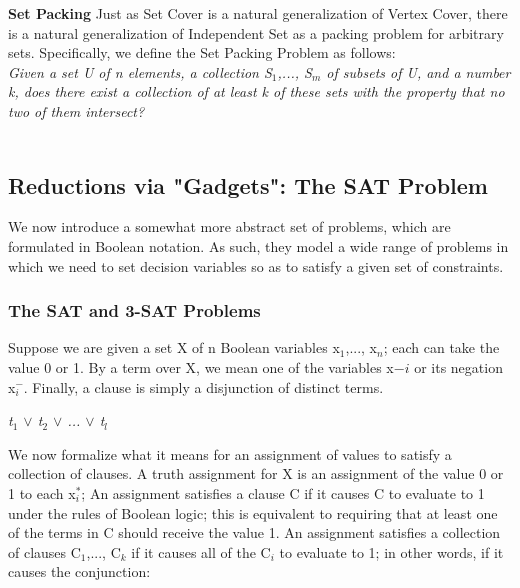 \documentclass{article}
\begin{document}
\textbf{Set Packing} Just as Set Cover is a natural generalization of Vertex Cover, there is a natural generalization of Independent Set as a packing problem for arbitrary sets. Specifically, we define the Set Packing Problem as follows:\\

\emph{Given a set U of n elements, a collection S$_1$,..., S$_m$ of subsets of U, and a number k, does there exist a collection of at least k of these sets with the property that no two of them intersect?}\\

\\

\subsection{Reductions via "Gadgets": The SAT Problem}
We now introduce a somewhat more abstract set of problems, which are formulated in Boolean notation. As such, they model a wide range of problems in which we need to set decision variables so as to satisfy a given set of constraints.\\

\subsubsection{The SAT and 3-SAT Problems}
Suppose we are given a set X of n Boolean variables x$_1$,..., x$_n$; each can take the value 0 or 1. By a term over X, we mean one of the variables x$-i$ or its negation x$_{i}^{-}$. Finally, a clause is simply a disjunction of distinct terms.\\

\begin{center}
    \emph{t$_1$ $\vee$ t$_2$ $\vee$ ... $\vee$ t$_l$}
\end{center}

We now formalize what it means for an assignment of values to satisfy a collection of clauses. A truth assignment for X is an assignment of the value 0 or 1 to each x$_{i}^{*}$; An assignment satisfies a clause C if it causes C to evaluate to 1 under the rules of Boolean logic; this is equivalent to requiring that at least one of the terms in C should receive the value 1. An assignment satisfies a collection of clauses C$_1$,..., C$_k$ if it causes all of the C$_i$ to evaluate to 1; in other words, if it causes the conjunction:\\
\end{document}
